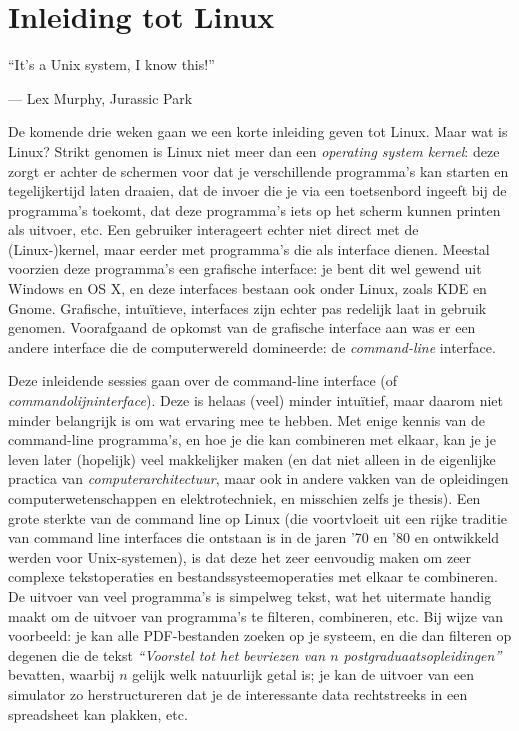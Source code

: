 \documentclass[a4paper,twoside,openany]{memoir}
\begin{document}
\epigraphfontsize{\small\itshape}

\chapter{Inleiding tot Linux}
\epigraph{``It’s a Unix system, I know this!''}{--- \textup{Lex Murphy}, Jurassic Park}

De komende drie weken gaan we een korte inleiding geven tot Linux. Maar wat is
Linux? Strikt genomen is Linux niet meer dan een \emph{operating system kernel}:
deze zorgt er achter de schermen voor dat je verschillende programma's kan
starten en tegelijkertijd laten draaien, dat de invoer die je via een
toetsenbord ingeeft bij de programma's toekomt, dat deze programma's iets op
het scherm kunnen printen als uitvoer, etc. Een gebruiker interageert echter
niet direct met de (Linux-)kernel, maar eerder met programma's die als interface
dienen. Meestal voorzien deze programma's een grafische interface: je bent dit
wel gewend uit Windows en OS X, en deze interfaces bestaan ook onder Linux,
zoals KDE en Gnome. Grafische, intuïtieve, interfaces zijn echter pas redelijk
laat in gebruik genomen. Voorafgaand de opkomst van de grafische interface aan
was er een andere interface die de computerwereld domineerde: de
\emph{command-line} interface.

Deze inleidende sessies gaan over de command-line interface (of
\emph{commandolijninterface}). Deze is  helaas (veel) minder intuïtief, maar
daarom niet minder belangrijk is om wat ervaring mee te hebben. Met enige kennis
van de command-line programma's, en hoe je die kan combineren met elkaar, kan je
je leven later (hopelijk) veel makkelijker maken (en dat niet alleen in de
eigenlijke practica van \emph{computerarchitectuur}, maar ook in andere vakken
van de opleidingen computerwetenschappen en elektrotechniek, en misschien zelfs
je thesis). Een grote sterkte van de command line op Linux (die voortvloeit uit
een rijke traditie van command line interfaces die ontstaan is in de jaren '70
en '80 en ontwikkeld werden voor Unix-systemen), is dat deze het zeer eenvoudig
maken om zeer complexe tekstoperaties en bestandssysteemoperaties met elkaar te
combineren. De uitvoer van veel programma's is simpelweg tekst, wat het
uitermate handig maakt om de uitvoer van programma's te filteren, combineren,
etc. Bij wijze van voorbeeld: je kan alle PDF-bestanden zoeken op je systeem, en
die dan filteren op degenen die de tekst \emph{``Voorstel tot het bevriezen van
$n$ postgraduaatsopleidingen''} bevatten, waarbij $n$ gelijk welk natuurlijk
getal is; je kan de uitvoer van een simulator zo herstructureren dat je de
interessante data rechtstreeks in een spreadsheet kan plakken, etc.
\end{document}
